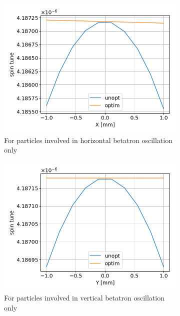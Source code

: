 \documentclass[a4paper]{jacow}
\begin{document}
\begin{figure}[h]
  \centering
  \begin{subfigure}{\linewidth}
    \centering
    \includegraphics[width=\linewidth]{../img/IPAC19/spin_tune_decoh_x_offset}
    \caption{For particles involved in horizontal betatron oscillation only\label{fig:st_decoh_horizontal}}
  \end{subfigure}
  \begin{subfigure}{\linewidth}
    \centering
    \includegraphics[width=\linewidth]{../img/IPAC19/spin_tune_decoh_y_offset}
    \caption{For particles involved in vertical betatron oscillation only}
  \end{subfigure}
  \begin{subfigure}{\linewidth}

\end{subfigure}
\end{figure}
\end{document}
